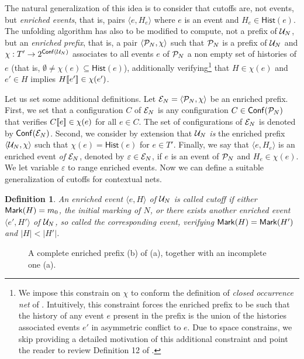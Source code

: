 \documentclass[11pt,a4paper]{article}
\newtheorem{definition}[theorem]{Definition}
\newcommand{\hist}[1]{\ensuremath{\mathsf{Hist}(#1)}}
\newcommand{\conf}[1]{\ensuremath{\mathsf{Conf}(#1)}}
\begin{document}
The natural generalization of this idea is to consider that cutoffs are, not
events, but \emph{enriched events}, that is, pairs $\langle e, H_e \rangle$
where $e$ is an event and $H_e \in \hist e$.  The unfolding algorithm has also
to be modified to compute, not a prefix of $\mathcal{U}_{N}$, but an \emph{enriched
prefix}, that is, a pair $\langle \mathcal{P}_{N}, \chi \rangle$ such that $\mathcal{P}_{N}$ is
a prefix of $\mathcal{U}_{N}$ and $\chi : T' \to 2^{\conf{\unf N}}$ associates to all
events $e$ of $\mathcal{P}_{N}$ a non empty set of histories of $e$ (that is,
$\emptyset \not = \chi(e) \subseteq \hist{e}$), additionally
verifying\footnote{We impose this constrain on $\chi$ to conform the definition
of \emph{closed occurrence net} of .  Intuitively, this constraint
forces the enriched prefix to be such that the history of any event $e$ present
in the prefix is the union of the histories associated events $e'$ in
asymmetric conflict to $e$.  Due to space constrains, we skip providing a
detailed motivation of this additional constraint and point the reader to
review Definition 12 of .} that $H \in \chi (e)$ and $e' \in H$
implies $H [\![ e']\!] \in \chi (e')$.

Let us set some additional definitions. Let $\mathcal{E}_{N} = \langle \mathcal{P}_{N}, \chi
\rangle$ be an enriched prefix.  First, we set that a configuration $C$ of
$\mathcal{E}_{N}$ is any configuration $C \in \conf{\pref N}$ that verifies $C [\![ e]\!]
\in \chi (e)$ for all $e \in C$.  The set of configurations of $\mathcal{E}_{N}$ is
denoted by $\conf{\enr N}$.  Second, we consider by extension that $\mathcal{U}_{N}$
\emph{is} the enriched prefix $\langle \mathcal{U}_{N}, \chi \rangle$ such that $\chi
(e) = \hist{e}$ for $e \in T'$.  Finally, we say that $\langle e, H_e \rangle$
is an enriched event \emph{of} $\mathcal{E}_{N}$, denoted by $\varepsilon \in \mathcal{E}_{N}$,
if $e$ is an event of $\mathcal{P}_{N}$ and $H_e \in \chi (e)$.  We let variable
$\varepsilon$ to range enriched events.  Now we can define a suitable
generalization of cutoffs for contextual nets.

\begin{definition}
\label{def:cutoff}
An enriched event $\langle e, H \rangle$ of $\mathcal{U}_{N}$ is called \emph{cutoff} if
either $\mathsf{Mark }{(H)} = m_0$, the initial marking of $N$, or there exists another
enriched event $\langle e', H' \rangle$ of $\mathcal{U}_{N}$, so called the
\emph{corresponding event}, verifying $\mathsf{Mark }{(H)} = \mathsf{Mark }{(H')}$ and $|H| <
|H'|$.
\end{definition}

\begin{figure}[t]
\caption{A complete enriched prefix (b) of  (a), together with an
incomplete one (a).}
\label{fig:a.complete}
\end{figure}
\end{document}
